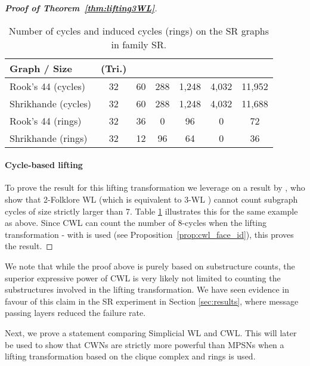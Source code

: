 \documentclass{article}
\begin{document}
\begin{proof}[\textbf{Proof of Theorem~\ref{thm:lifting3WL}}]
\begin{table}[h!]
    \centering
    \caption{Number of cycles and induced cycles (rings) on the SR graphs in family SR.}
    \label{tab:sr_ring_counts}\vspace{1mm}
\begin{tabular}{l|cccccc}
    \toprule
    Graph  / Size  & 
         (Tri.) & 
         &
         &
         &
         &
         \\
    \midrule
    Rook's 44 (cycles)&
        32 &
        60 &
        288 &
        1,248 &
        4,032 &
        11,952 \\
    Shrikhande (cycles)&
        32 &
        60 &
        288 &
        1,248 &
        4,032 &
        11,688 \\
    \midrule
    Rook's 44 (rings)&
        32 &
        36 &
        0 &
        96 &
        0 &
        72 \\
    Shrikhande (rings)&
        32 &
        12 &
        96 &
        64 &
        0 &
        36 \\
    \bottomrule
    \end{tabular}
\end{table}


\paragraph{Cycle-based lifting} To prove the result for this lifting transformation we leverage on a result by \citet{ARVIND202042}, who show that 2-Folklore WL (which is equivalent to 3-WL \citep{sato2020survey}) cannot count subgraph cycles of size strictly larger than 7. Table \ref{tab:sr_ring_counts} illustrates this for the same example as above. Since CWL can count the number of 8-cycles when the lifting transformation - with  is used (see Proposition~\ref{prop:cwl_face_id}), this proves the result. 

\end{proof}

We note that while the proof above is purely based on substructure counts, the superior expressive power of CWL is very likely not limited to counting the substructures involved in the lifting transformation. We have seen evidence in favour of this claim in the SR experiment in Section \ref{sec:results}, where message passing layers reduced the failure rate. 

Next, we prove a statement comparing Simplicial WL and CWL. This will later be used to show that CWNs are strictly more powerful than MPSNs when a lifting transformation based on the clique complex and rings is used.  
\end{document}
